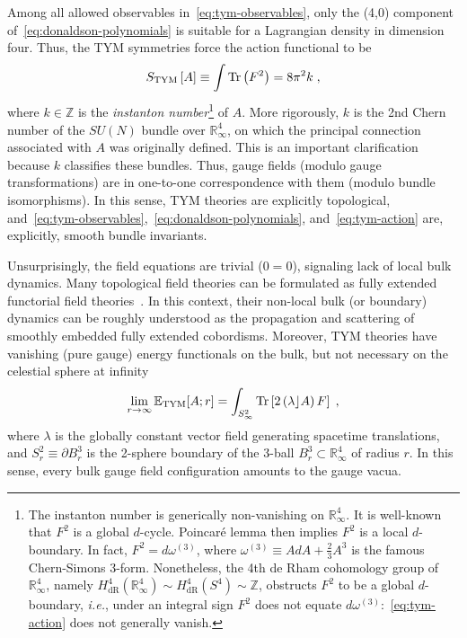 \documentclass[../main.tex]{subfiles}
\begin{document}
Among all allowed observables in~\eqref{eq:tym-observables}, only the (4,0) component of~\eqref{eq:donaldson-polynomials} is suitable for a Lagrangian density in dimension four. Thus, the TYM symmetries force the action functional to be
\begin{equation}%
  \label{eq:tym-action}
  S_{\text{TYM}}\left[ A \right]  \equiv  \int \tr\left(F^2\right)
  = 8 \pi^2 k \;,
\end{equation}
where $ k \in \mathbb{Z} $ is the \textit{instanton number}\footnote{The instanton number is generically non-vanishing on $\mathbb{R}^{4}_{\infty}$. It is well-known that $F^2$ is a global $d$-cycle. Poincaré lemma then implies $F^2$ is a local $d$-boundary. In fact, $F^2 = d \omega^{(3)} $, where $\omega^{(3)} \equiv AdA+\tfrac{2}{3}A^3$ is the famous Chern-Simons 3-form. Nonetheless, the 4th de Rham cohomology group of $\mathbb{R}^{4}_{\infty}$, namely $ H^4_{\text{dR}} \left( \mathbb{R}^{4}_{\infty}\right) \sim H^4_{\text{dR}} \left( S^{4}\right) \sim \mathbb{Z} $, obstructs $F^2$ to be a global $d$-boundary, \textit{i.e.}, under an integral sign $F^2$ does not equate $d \omega^{(3)}$:~\eqref{eq:tym-action} does not generally vanish.} of $A$. More rigorously, $k$ is the 2nd Chern number of the $SU(N)$ bundle over $\mathbb{R}^{4}_{\infty}$, on which the principal connection associated with $A$ was originally defined. This is an important clarification because $k$ classifies these bundles. Thus, gauge fields (modulo gauge transformations) are in one-to-one correspondence with them (modulo bundle isomorphisms). In this sense, TYM theories are explicitly topological, and~\eqref{eq:tym-observables},~\eqref{eq:donaldson-polynomials}, and~\eqref{eq:tym-action} are, explicitly, smooth bundle invariants.

Unsurprisingly, the field equations are trivial ($0=0$), signaling lack of local bulk dynamics. Many topological field theories can be formulated as fully extended functorial field theories~\cite{atiyah1988a,segal1988a,baez1995a,schreiber2009a,baez2009a}. In this context, their non-local bulk (or boundary) dynamics can be roughly understood as the propagation and scattering of smoothly embedded fully extended cobordisms. Moreover, TYM theories have vanishing (pure gauge) energy functionals on the bulk, but not necessary on the celestial sphere at infinity
\begin{equation}%
  \label{eq:tym-energy}
  \lim_{ r \to \infty}  \mathbb{E}_{\text{TYM}} [A; r] = \int_{S^{2}_{\infty}} \tr \left[2\left(\lambda \rfloor A\right)F\right] \;,
\end{equation}
where $\lambda$ is the globally constant vector field generating spacetime translations, and $S^{2}_r \equiv \partial B^3_r$ is the 2-sphere boundary of the 3-ball $B^3_r \subset \mathbb{R}^{4}_{\infty} $ of radius $r$. In this sense, every bulk gauge field configuration amounts to the gauge vacua.
\end{document}
